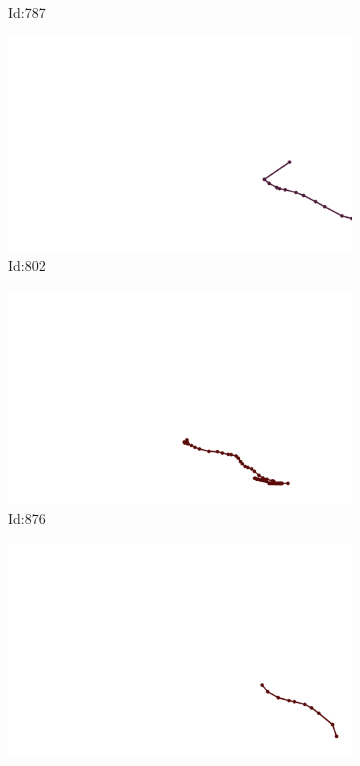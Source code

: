 \documentclass[12pt,twoside]{report}
\begin{document}
\begin{figure}
\begin{subfigure}[b]{0.20\textwidth}
\caption{Id:787}
\end{subfigure}
\begin{subfigure}[b]{0.20\textwidth}
\centering
\includegraphics[width=\textwidth]{../trajectories/802.png}
\caption{Id:802}
\end{subfigure}
\begin{subfigure}[b]{0.20\textwidth}
\centering
\includegraphics[width=\textwidth]{../trajectories/876.png}
\caption{Id:876}
\end{subfigure}
\begin{subfigure}[b]{0.20\textwidth}
\centering
\includegraphics[width=\textwidth]{../trajectories/967.png}

\end{subfigure}
\end{figure}
\end{document}
